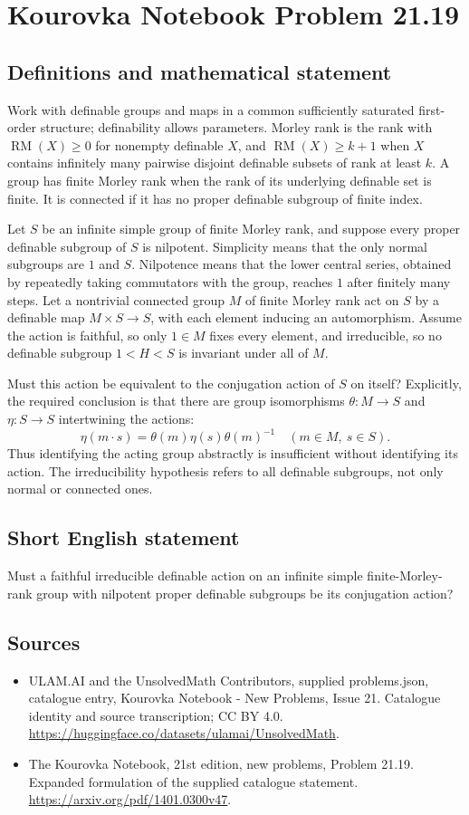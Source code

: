 \documentclass[11pt,a4paper]{article}
\begin{document}
\section*{Kourovka Notebook Problem 21.19}\label{statement}

\subsection{Definitions and mathematical statement}
Work with definable groups and maps in a common sufficiently saturated
first-order structure; definability allows parameters. Morley rank is
the rank with $\operatorname{RM}(X)\ge0$ for nonempty definable $X$, and
$\operatorname{RM}(X)\ge k+1$ when $X$ contains infinitely many pairwise
disjoint definable subsets of rank at least $k$. A group has finite
Morley rank when the rank of its underlying definable set is finite.
It is connected if it has no proper definable subgroup of finite index.

Let $S$ be an infinite simple group of finite Morley rank, and suppose
every proper definable subgroup of $S$ is nilpotent. Simplicity means
that the only normal subgroups are $1$ and $S$. Nilpotence means that
the lower central series, obtained by repeatedly taking commutators
with the group, reaches $1$ after finitely many steps.
Let a nontrivial connected group $M$ of finite Morley rank act on $S$
by a definable map $M\times S\to S$, with each element inducing an
automorphism. Assume the action is faithful, so only $1\in M$ fixes
every element, and irreducible, so no definable subgroup
$1<H<S$ is invariant under all of $M$.

Must this action be equivalent to the conjugation action of $S$ on
itself? Explicitly, the required conclusion is that there are group
isomorphisms $\theta:M\to S$ and $\eta:S\to S$ intertwining the actions:
\[
 \eta(m\cdot s)=\theta(m)\eta(s)\theta(m)^{-1}
                       \quad(m\in M,\ s\in S).
\]
Thus identifying the acting group abstractly is insufficient without
identifying its action. The irreducibility hypothesis refers to all
definable subgroups, not only normal or connected ones.
\subsection{Short English statement}
Must a faithful irreducible definable action on an infinite simple finite-Morley-rank group with nilpotent proper definable subgroups be its conjugation action?
\subsection{Sources}
\begin{itemize}
\item[S1] ULAM.AI and the UnsolvedMath Contributors, supplied problems.json, catalogue entry, Kourovka Notebook - New Problems, Issue 21. Catalogue identity and source transcription; CC BY 4.0.
\url{https://huggingface.co/datasets/ulamai/UnsolvedMath}.
\item[S2] The Kourovka Notebook, 21st edition, new problems, Problem 21.19. Expanded formulation of the supplied catalogue statement.
\url{https://arxiv.org/pdf/1401.0300v47}.
\end{itemize}
\end{document}
